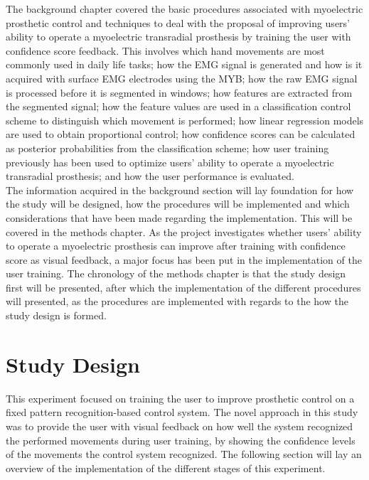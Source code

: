 The background chapter covered the basic procedures associated with myoelectric prosthetic control and techniques to deal with the proposal of improving users' ability to operate a myoelectric transradial prosthesis by training the user with confidence score feedback. This involves which hand movements are most commonly used in daily life tasks; how the EMG signal is generated and how is it acquired with surface EMG electrodes using the MYB; how the raw EMG signal is processed before it is segmented in windows; how features are extracted from the segmented signal; how the feature values are used in a classification control scheme to distinguish which movement is performed; how linear regression models are used to obtain proportional control; how confidence scores can be calculated as posterior probabilities from the classification scheme; how user training previously has been used to optimize users' ability to operate a myoelectric transradial prosthesis; and how the user performance is evaluated. \\
The information acquired in the background section will lay foundation for how the study will be designed, how the procedures will be implemented and which considerations that have been made regarding the implementation. This will be covered in the methods chapter. As the project investigates whether users' ability to operate a myoelectric prosthesis can improve after training with confidence score as visual feedback, a major focus has been put in the implementation of the user training. The chronology of the methods chapter is that the study design first will be presented, after which the implementation of the different procedures will presented, as the procedures are implemented with regards to the how the study design is formed. 



\section{Study Design} \label{sec:M:studyDesign}

This experiment focused on training the user to improve prosthetic control on a fixed pattern recognition-based control system. The novel approach in this study was to provide the user with visual feedback on how well the system recognized the performed movements during user training, by showing the confidence levels of the movements the control system recognized. The following section will lay an overview of the implementation of the different stages of this experiment.

